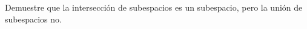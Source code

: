 \item Demuestre que la intersección de subespacios es un subespacio, pero la unión de subespacios no.
